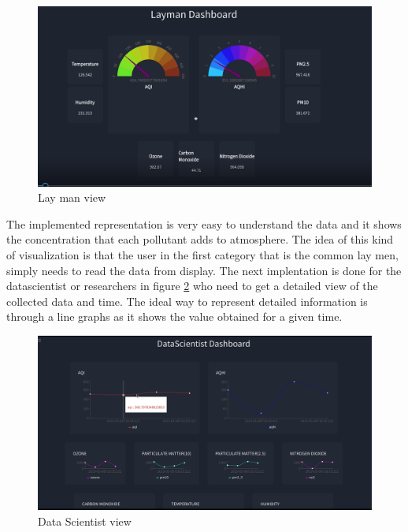 \begin{figure}[h]
  \begin{center}
  \includegraphics[scale=0.55]{./images/figure14.png}
  \end{center}
  \caption{Lay man view}
  \label{view1}
\end{figure}

The implemented representation is very easy to understand the data and it shows the concentration that each pollutant adds to atmosphere. The idea of this kind of visualization is that the user in the first category that is the common lay men, simply needs to read the data from display.
The next implentation is done for the  datascientist or researchers in figure \ref{view2} who need to get a detailed view of the collected data and time. The ideal way to represent detailed information is through a line graphs as it shows the value obtained for a given time. 

\begin{figure}[h]
  \begin{center}
  \includegraphics[scale=0.40]{./images/figure15.png}
  \end{center}
  \caption{Data Scientist view}
  \label{view2}
\end{figure}

